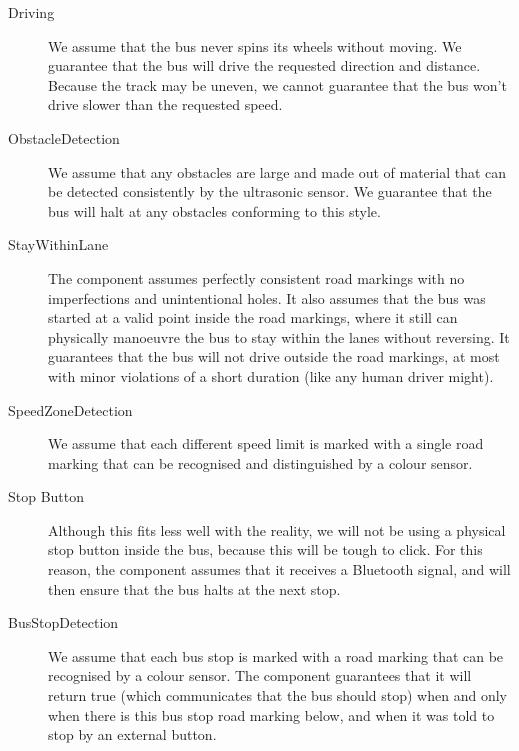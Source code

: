 \begin{description}
    \item[Driving]
    We assume that the bus never spins its wheels without moving. We guarantee that the bus will drive the requested direction and distance. Because the track may be uneven, we cannot guarantee that the bus won't drive slower than the requested speed. 
    
    \item[ObstacleDetection]
    We assume that any obstacles are large and made out of material that can be detected consistently by the ultrasonic sensor. We guarantee that the bus will halt at any obstacles conforming to this style. 
    
    \item[StayWithinLane]
    The component assumes perfectly consistent road markings with no imperfections and unintentional holes. It also assumes that the bus was started at a valid point inside the road markings, where it still can physically manoeuvre the bus to stay within the lanes without reversing. It guarantees that the bus will not drive outside the road markings, at most with minor violations of a short duration (like any human driver might). 
    
    \item[SpeedZoneDetection]
    We assume that each different speed limit is marked with a single road marking that can be recognised and distinguished by a colour sensor. 
    

    \item[Stop Button]
    Although this fits less well with the reality, we will not be using a physical stop button inside the bus, because this will be tough to click. For this reason, the component assumes that it receives a Bluetooth signal, and will then ensure that the bus halts at the next stop.  
    
    \item[BusStopDetection]
    We assume that each bus stop is marked with a road marking that can be recognised by a colour sensor. The component guarantees that it will return true (which communicates that the bus should stop) when and only when there is this bus stop road marking below, and when it was told to stop by an external button.  
    
    
\end{description}